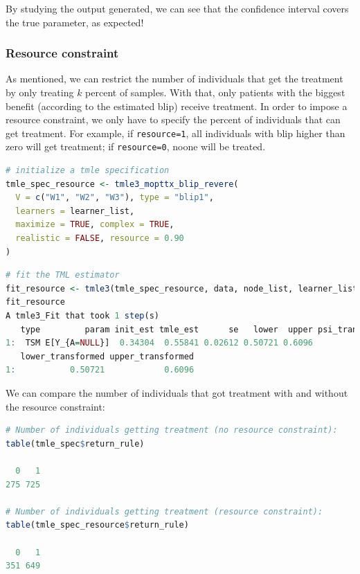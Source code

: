 \documentclass[
  12pt, krantz2,
]{krantz}
\newcommand{\passthrough}[1]{#1}
\theoremstyle{definition}
\theoremstyle{definition}
\theoremstyle{definition}
\newcommand{\1}{\mathbbm{1}}
\begin{document}
By studying the output generated, we can see that the confidence interval covers the
true parameter, as expected!

\hypertarget{resource-constraint}{%
\subsubsection{Resource constraint}\label{resource-constraint}}

As mentioned, we can restrict the number of individuals that get the treatment by only
treating \(k\) percent of samples. With that, only patients with the biggest benefit (according
to the estimated blip) receive treatment. In order to impose a
resource constraint, we only have to specify the percent of individuals that can
get treatment. For example, if \passthrough{\lstinline!resource=1!}, all
individuals with blip higher than zero will get treatment; if \passthrough{\lstinline!resource=0!},
noone will be treated.

\begin{lstlisting}[language=R]
# initialize a tmle specification
tmle_spec_resource <- tmle3_mopttx_blip_revere(
  V = c("W1", "W2", "W3"), type = "blip1",
  learners = learner_list,
  maximize = TRUE, complex = TRUE,
  realistic = FALSE, resource = 0.90
)
\end{lstlisting}

\begin{lstlisting}[language=R]
# fit the TML estimator
fit_resource <- tmle3(tmle_spec_resource, data, node_list, learner_list)
fit_resource
A tmle3_Fit that took 1 step(s)
   type         param init_est tmle_est      se   lower  upper psi_transformed
1:  TSM E[Y_{A=NULL}]  0.34304  0.55841 0.02612 0.50721 0.6096         0.55841
   lower_transformed upper_transformed
1:           0.50721            0.6096
\end{lstlisting}

We can compare the number of individuals that got treatment with and without the
resource constraint:

\begin{lstlisting}[language=R]
# Number of individuals getting treatment (no resource constraint):
table(tmle_spec$return_rule)

  0   1 
275 725 

# Number of individuals getting treatment (resource constraint):
table(tmle_spec_resource$return_rule)

  0   1 
351 649 
\end{lstlisting}
\end{document}
